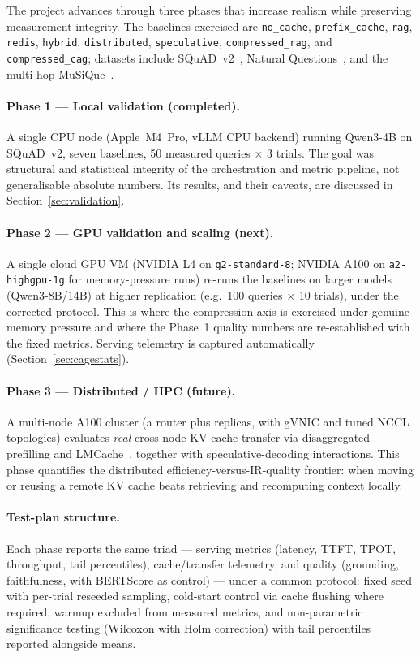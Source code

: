 \documentclass[12pt,a4paper]{article}
\let\cite\citep
\begin{document}
The project advances through three phases that increase realism while preserving
measurement integrity. The baselines exercised are \texttt{no\_cache},
\texttt{prefix\_cache}, \texttt{rag}, \texttt{redis}, \texttt{hybrid},
\texttt{distributed}, \texttt{speculative}, \texttt{compressed\_rag}, and
\texttt{compressed\_cag}; datasets include SQuAD~v2~\cite{rajpurkar2018squad},
Natural Questions~\cite{kwiatkowski2019nq}, and the multi-hop
MuSiQue~\cite{trivedi2022musique}.

\paragraph{Phase 1 --- Local validation (completed).} A single CPU node
(Apple~M4~Pro, vLLM CPU backend) running Qwen3-4B on SQuAD~v2, seven baselines,
50 measured queries $\times$ 3 trials. The goal was structural and statistical
integrity of the orchestration and metric pipeline, not generalisable absolute
numbers. Its results, and their caveats, are discussed in
Section~\ref{sec:validation}.

\paragraph{Phase 2 --- GPU validation and scaling (next).} A single cloud GPU VM
(NVIDIA L4 on \texttt{g2-standard-8}; NVIDIA A100 on \texttt{a2-highgpu-1g} for
memory-pressure runs) re-runs the baselines on larger models (Qwen3-8B/14B) at
higher replication (e.g.\ 100 queries $\times$ 10 trials), under the corrected
protocol. This is where the compression axis is exercised under genuine memory
pressure and where the Phase~1 quality numbers are re-established with the fixed
metrics. Serving telemetry is captured automatically (Section~\ref{sec:cagestats}).

\paragraph{Phase 3 --- Distributed / HPC (future).} A multi-node A100 cluster (a
router plus replicas, with gVNIC and tuned NCCL topologies) evaluates \emph{real}
cross-node KV-cache transfer via disaggregated prefilling and
LMCache~\cite{vllm2024disagg, lmcache}, together with speculative-decoding
interactions. This phase quantifies the distributed efficiency-versus-IR-quality
frontier: when moving or reusing a remote KV cache beats retrieving and recomputing
context locally.

\paragraph{Test-plan structure.} Each phase reports the same triad --- serving
metrics (latency, TTFT, TPOT, throughput, tail percentiles), cache/transfer
telemetry, and quality (grounding, faithfulness, with BERTScore as control) ---
under a common protocol: fixed seed with per-trial reseeded sampling, cold-start
control via cache flushing where required, warmup excluded from measured metrics,
and non-parametric significance testing (Wilcoxon with Holm correction) with tail
percentiles reported alongside means.
\end{document}
